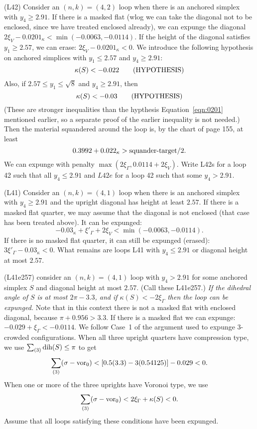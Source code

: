 \documentclass[11pt]{amsart}
\def\op#1{{\text{#1}}}
\def\text{\hbox}
\begin{document}
(L42) Consider an $(n,k)=(4,2)$ loop when there is an anchored simplex with $y_4\ge 2.91$.  
If there is a masked flat (wlog we can take the diagonal not to be enclosed, since we have treated enclosed already),  we can expunge the diagonal $2\xi_V - 0.0201_\kappa < \min(-0.0063,-0.0114)$.  If the height of the diagonal satisfies $y_1\ge 2.57$, we can erase: $2\xi_V - 0.0201_\kappa < 0$.  We introduce the following
hypothesis on anchored simplices with $y_1 \le 2.57$ and $y_4 \ge 2.91$:
  \begin{equation}
  \kappa(S) < - 0.022\qquad\text{(HYPOTHESIS)}
  \end{equation}
Also, if $2.57\le y_1\le\sqrt8$ and $y_4\ge 2.91$, then
  \begin{equation}
  \kappa(S) < - 0.03\qquad\text{(HYPOTHESIS)}
  \end{equation}
(These are stronger inequalities than the hypthesis Equation~\ref{eqn:0201} mentioned earlier, so a separate proof of the earlier inequality is not needed.)
Then the material squandered around the loop is, by the chart of page 155, at least 
  $$
  0.3992 + 0.022_\kappa > \op{squander-target}/2.
  $$
We can expunge with penalty $\max(2\xi_\Gamma,0.0114+2\xi_V)$.
Write L42s for a loop 42 such that all $y_4\le 2.91$ and $L42e$ for a loop
42 such that some $y_4>2.91$.

  
(L41) Consider an $(n,k)=(4,1)$ loop when there is an anchored simplex with $y_4\ge 2.91$ and the upright diagonal has height at least $2.57$.  If there is a masked
flat quarter, we may assume that the diagonal is not enclosed (that case
has been treated above).  It can be expunged: $$-0.03_\kappa + \xi'_\Gamma + 2\xi_V < \min(-0.0063,-0.0114).$$  If there is no masked flat quarter, it can
still be expunged (erased):  $3\xi'_\Gamma - 0.03_\kappa < 0$.  What remains are loops L41 with $y_4\le 2.91$ or diagonal height at most $2.57$.

(L41e257) consider an $(n,k)=(4,1)$ loop with $y_4>2.91$ for some anchored simplex $S$ and diagonal
height at most $2.57$.  (Call these L41e257.)  {\it If the dihedral angle of $S$ is at most $2\pi - 3.3$, and if $\kappa(S)< -2\xi_\Gamma$
then the loop can be expunged.}
Note that in this context there is not a masked flat with enclosed diagonal, because $\pi + 0.956 > 3.3$.  If there is a masked flat
we can expunge: $-0.029 + \xi_\Gamma < -0.0114$.  We follow Case~1 of the argument used to expunge $3$-crowded configurations. 
When all three upright quarters have compression type, we use
$\sum_{(3)} \op{dih}(S) \le \pi$ to get
   $$\sum_{(3)}(\sigma-\op{vor}_0) < 
      [0.5 (3.3) - 3 (0.54125)] - 0.029 < 0.$$
When one or more of the three uprights have Voronoi type, we use
  $$\sum_{(3)}(\sigma - \op{vor}_0 ) <
    2 \xi_\Gamma
    +\kappa(S) 
     < 0.$$
Assume that all loops satisfying these conditions have been expunged.
\end{document}

